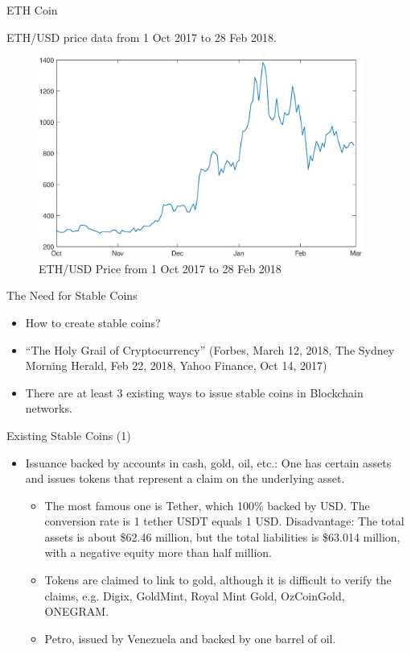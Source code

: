 \documentclass[notes=show, beamer, handout]{beamer}
\begin{document}
\begin{frame}{ETH Coin}

ETH/USD price data from 1 Oct 2017 to 28 Feb 2018. 

\begin{figure}[htb]
\begin{centering}
\includegraphics[width=0.95\textwidth]{eth_price}
\par\end{centering}
\caption{ETH/USD Price from 1 Oct 2017 to 28 Feb 2018}\label{fig:ethprice}
\end{figure}
\end{frame}


\begin{frame}{The Need for Stable Coins}

\begin{itemize}
\item How to create stable coins?
\pause
\item ``The Holy Grail of Cryptocurrency'' (Forbes, March 12, 2018, The Sydney Morning Herald, Feb 22, 2018, Yahoo Finance, Oct 14, 2017)
\pause
\item There are at least 3 existing ways to issue stable coins in Blockchain networks.
\end{itemize}
\end{frame}



\begin{frame}{Existing Stable Coins (1)}
\begin{itemize}
\item Issuance backed by accounts in cash, gold, oil, etc.: One has certain assets and issues tokens that represent a claim on the underlying asset.
\begin{itemize}
\item The most famous one is Tether,
which  100\% backed by USD. The conversion rate is 1 tether USDT equals 1 USD. Disadvantage: The total assets is about \$62.46 million, but the total liabilities is \$63.014 million, with a negative equity more than half million.
\item  Tokens are claimed to link to gold, although it is difficult to verify the claims, e.g. Digix, GoldMint, Royal Mint Gold, OzCoinGold, ONEGRAM.
\item Petro, issued by Venezuela and backed by one barrel of oil.
\end{itemize}
\end{itemize}
\end{frame}
\end{document}

